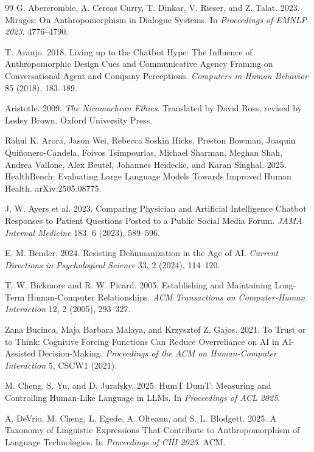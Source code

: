 \documentclass[manuscript,review,anonymous]{acmart}
\begin{document}
\begin{thebibliography}{99}
G. Abercrombie, A. Cercas Curry, T. Dinkar, V. Rieser, and Z. Talat.
2023.
Mirages: On Anthropomorphism in Dialogue Systems.
In \textit{Proceedings of EMNLP 2023}. 4776--4790.

T. Araujo.
2018.
Living up to the Chatbot Hype: The Influence of Anthropomorphic Design Cues and Communicative Agency Framing on Conversational Agent and Company Perceptions.
\textit{Computers in Human Behavior} 85 (2018), 183--189.

Aristotle.
2009.
\textit{The Nicomachean Ethics}.
Translated by David Ross, revised by Lesley Brown. Oxford University Press.

Rahul K. Arora, Jason Wei, Rebecca Soskin Hicks, Preston Bowman, Joaquin Qui\~nonero-Candela, Foivos Tsimpourlas, Michael Sharman, Meghan Shah, Andrea Vallone, Alex Beutel, Johannes Heidecke, and Karan Singhal. 2025.
HealthBench: Evaluating Large Language Models Towards Improved Human Health.
arXiv:2505.08775.

J. W. Ayers et al.
2023.
Comparing Physician and Artificial Intelligence Chatbot Responses to Patient Questions Posted to a Public Social Media Forum.
\textit{JAMA Internal Medicine} 183, 6 (2023), 589--596.

E. M. Bender.
2024.
Resisting Dehumanization in the Age of AI.
\textit{Current Directions in Psychological Science} 33, 2 (2024), 114--120.

T. W. Bickmore and R. W. Picard.
2005.
Establishing and Maintaining Long-Term Human-Computer Relationships.
\textit{ACM Transactions on Computer-Human Interaction} 12, 2 (2005), 293--327.

Zana Bucinca, Maja Barbara Malaya, and Krzysztof Z. Gajos. 2021. To Trust or to Think: Cognitive Forcing Functions Can Reduce Overreliance on AI in AI-Assisted Decision-Making. \textit{Proceedings of the ACM on Human-Computer Interaction} 5, CSCW1 (2021).

M. Cheng, S. Yu, and D. Jurafsky.
2025.
HumT DumT: Measuring and Controlling Human-Like Language in LLMs.
In \textit{Proceedings of ACL 2025}.

A. DeVrio, M. Cheng, L. Egede, A. Olteanu, and S. L. Blodgett.
2025.
A Taxonomy of Linguistic Expressions That Contribute to Anthropomorphism of Language Technologies.
In \textit{Proceedings of CHI 2025}. ACM.


\end{thebibliography}
\end{document}
